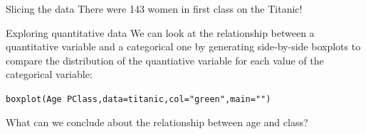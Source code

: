 \documentclass{beamer}\usepackage[]{graphicx}\usepackage[]{color}
\makeatletter
\newcommand{\hlstr}[1]{\textcolor[rgb]{1,0.894,0.71}{#1}}%
\newcommand{\hlopt}[1]{\textcolor[rgb]{1,0.894,0.769}{#1}}%
\newcommand{\hlstd}[1]{\textcolor[rgb]{1,0.894,0.769}{#1}}%
\newcommand{\hlkwc}[1]{\textcolor[rgb]{0.78,0.941,0.545}{#1}}%
\newcommand{\hlkwd}[1]{\textcolor[rgb]{1,0.78,0.769}{#1}}%
\newenvironment{kframe}{%
 \def\at@end@of@kframe{}%
 \ifinner\ifhmode%
  \def\at@end@of@kframe{\end{minipage}}%
  \begin{minipage}{\columnwidth}%
 \fi\fi%
 \def\FrameCommand##1{\hskip\@totalleftmargin \hskip-\fboxsep
 \colorbox{shadecolor}{##1}\hskip-\fboxsep
     \hskip-\linewidth \hskip-\@totalleftmargin \hskip\columnwidth}%
 \MakeFramed {\advance\hsize-\width
   \@totalleftmargin\z@ \linewidth\hsize
   \@setminipage}}%
 {\par\unskip\endMakeFramed%
 \at@end@of@kframe}
\newenvironment{knitrout}{}{} %
\makeatother
\begin{document}
\begin{darkframes}
\begin{frame}[fragile]{Slicing the data}
      There were 143 women in first class on the Titanic!
    \end{frame}








    \begin{frame}[fragile]{Exploring quantitative data}
      We can look at the relationship between a quantitative variable and a categorical one by generating side-by-side boxplots to compare the distribution of the quantiative variable for each value of the categorical variable:

      \pause

\begin{knitrout}
\begin{kframe}
\begin{alltt}
\hlkwd{boxplot}\hlstd{(Age} \hlopt{~} \hlstd{PClass,} \hlkwc{data}\hlstd{=titanic,} \hlkwc{col}\hlstd{=}\hlstr{"green"}\hlstd{,} \hlkwc{main}\hlstd{=}\hlstr{""}\hlstd{)}
\end{alltt}
\end{kframe}


\end{knitrout}

      What can we conclude about the relationship between age and class?
    \end{frame}
  \end{darkframes}
\end{document}
